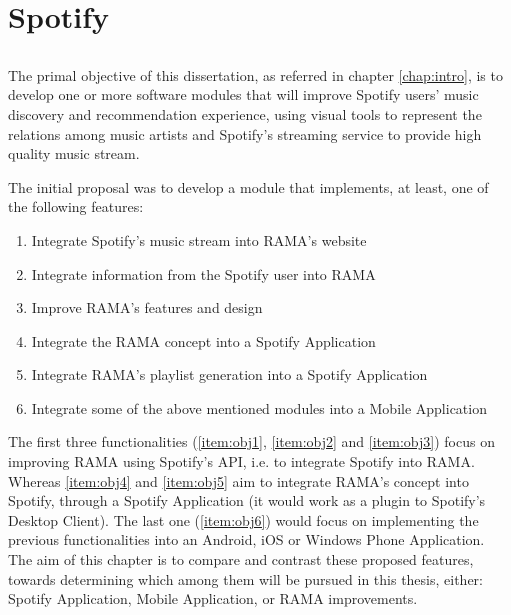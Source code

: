 
\chapter{Spotify}
\label{chap:chap3}

\section*{}

The primal objective of this dissertation, as referred in chapter \ref{chap:intro}, is to develop one or more software modules that will improve Spotify users' music discovery and recommendation experience, using visual tools to represent the relations among music artists and Spotify's streaming service to provide high quality music stream.

The initial proposal was to develop a module that implements, at least, one of the following features:

\begin{enumerate}
  \label{chap3:modules}
  \item \label{item:obj1} Integrate Spotify's music stream into RAMA's website
  \item \label{item:obj2} Integrate information from the Spotify user into RAMA
  \item \label{item:obj3} Improve RAMA's features and design
  \item \label{item:obj4} Integrate the RAMA concept into a Spotify Application
  \item \label{item:obj5} Integrate RAMA's playlist generation into a Spotify Application
  \item \label{item:obj6} Integrate some of the above mentioned modules into a Mobile Application
\end{enumerate}


The first three functionalities (\ref{item:obj1}, \ref{item:obj2} and \ref{item:obj3}) focus on improving RAMA using Spotify's API, i.e. to integrate Spotify into RAMA.
Whereas \ref{item:obj4} and \ref{item:obj5} aim to integrate RAMA's concept into Spotify, through a Spotify Application (it would work as a plugin to Spotify's Desktop Client).
The last one (\ref{item:obj6}) would focus on implementing the previous functionalities into an Android, iOS or Windows Phone Application.
The aim of this chapter is to compare and contrast these proposed features, towards determining which among them will be pursued in this thesis, either: Spotify Application, Mobile Application, or RAMA improvements.

